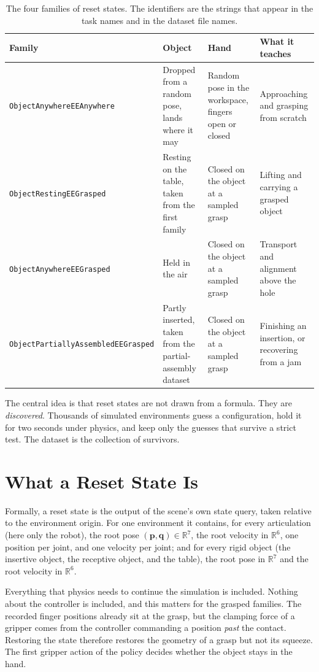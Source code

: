 \documentclass{article}
\newcommand{\R}{\mathbb{R}}
\newcommand{\code}[1]{\texttt{#1}}
\begin{document}
\begin{table}[t]
\centering
\caption{The four families of reset states. The identifiers are the strings that appear in the task names and in the dataset file names.}
\label{tab:families}
\small
\begin{tabular}{@{}p{3.6cm}p{3.0cm}p{3.0cm}p{2.9cm}@{}}
\toprule
Family & Object & Hand & What it teaches\\
\midrule
\code{ObjectAnywhere\-EEAnywhere} & Dropped from a random pose, lands where it may & Random pose in the workspace, fingers open or closed & Approaching and grasping from scratch\\
\code{ObjectResting\-EEGrasped} & Resting on the table, taken from the first family & Closed on the object at a sampled grasp & Lifting and carrying a grasped object\\
\code{ObjectAnywhere\-EEGrasped} & Held in the air & Closed on the object at a sampled grasp & Transport and alignment above the hole\\
\code{ObjectPartially\-Assembled\-EEGrasped} & Partly inserted, taken from the partial-assembly dataset & Closed on the object at a sampled grasp & Finishing an insertion, or recovering from a jam\\
\bottomrule
\end{tabular}
\end{table}

The central idea is that reset states are not drawn from a formula. They are \emph{discovered}. Thousands of simulated environments guess a configuration, hold it for two seconds under physics, and keep only the guesses that survive a strict test. The dataset is the collection of survivors.

\section{What a Reset State Is}
\label{sec:what}

Formally, a reset state is the output of the scene's own state query, taken relative to the environment origin. For one environment it contains, for every articulation (here only the robot), the root pose $(\bm p,\bm q)\in\R^7$, the root velocity in $\R^6$, one position per joint, and one velocity per joint; and for every rigid object (the insertive object, the receptive object, and the table), the root pose in $\R^7$ and the root velocity in $\R^6$.

Everything that physics needs to continue the simulation is included. Nothing about the controller is included, and this matters for the grasped families. The recorded finger positions already sit at the grasp, but the clamping force of a gripper comes from the controller commanding a position \emph{past} the contact. Restoring the state therefore restores the geometry of a grasp but not its squeeze. The first gripper action of the policy decides whether the object stays in the hand.
\end{document}
